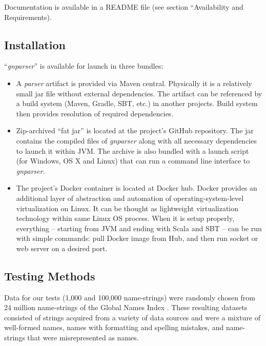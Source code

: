 \documentclass{bmcart}
\begin{document}
Documentation is available in a README file (see section ``Availability and
Requirements).

\subsection*{Installation}

``\textit{gnparser}'' is available for launch in three bundles:

\begin{itemize}
  \item A \textit{parser} artifact is provided via Maven central. Physically
    it is a relatively small jar file without external dependencies. The
    artifact can be referenced by a build system (Maven, Gradle, SBT, etc.) in
    another projects. Build system then provides resolution of required
    dependencies.

  \item Zip-archived ``fat jar'' is located at the project's GitHub repository.
    The jar contains the compiled files of \textit{gnparser} along with all
    necessary dependencies to launch it within JVM. The archive is also bundled
    with a launch script (for Windows, OS X and Linux) that can run a command
    line interface to \textit{gnparser}.

  \item The project's Docker container is located at Docker hub. Docker
    provides an additional layer of abstraction and automation of
    operating-system-level virtualization on Linux. It can be thought as
    lightweight virtualization technology within same Linux OS process. When
    it is setup properly, everything -- starting from JVM and ending with
    Scala and SBT -- can be run with simple commands: pull Docker image from
    Hub, and then run socket or web server on a desired port.


\end{itemize}

\subsection*{Testing Methods}

Data for our tests (1,000 and 100,000 name-strings) were randomly chosen from
24 million name-strings of the Global Names Index \cite{gn:index}. These
resulting datasets consisted of strings acquired from a variety of data sources
and were a mixture of well-formed names, names with formatting and spelling
mistakes, and name-strings that were misrepresented as names.
\end{document}
